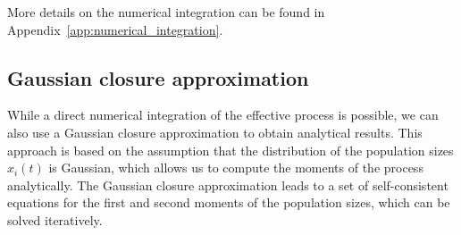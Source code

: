 \documentclass[
    preprint,
    linenumbers,
    amsmath,amssymb,amsfonts,
    aps, physrev,
    superscriptaddress,
    10pt,
    bibnotes
    ]{revtex4-2}
\begin{document}
More details on the numerical integration can be found in Appendix~\ref{app:numerical_integration}.

    
\subsection{Gaussian closure approximation}
While a direct numerical integration of the effective process is possible, we can also use a Gaussian closure approximation to obtain analytical results. This approach is based on the assumption that the distribution of the population sizes $x_i(t)$ is Gaussian, which allows us to compute the moments of the process analytically. The Gaussian closure approximation leads to a set of self-consistent equations for the first and second moments of the population sizes, which can be solved iteratively.
\end{document}

